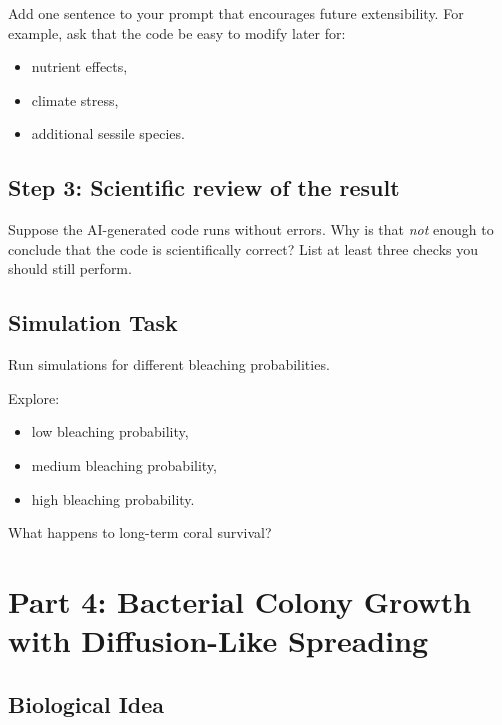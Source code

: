\documentclass[paper=letter, fontsize=12pt]{article}
\numberwithin{equation}{section}
\begin{document}
\begin{aibox}
Add one sentence to your prompt that encourages future extensibility. For example, ask that the code be easy to modify later for:
\begin{itemize}
\item nutrient effects,
\item climate stress,
\item additional sessile species.
\end{itemize}
\end{aibox}

\subsection*{Step 3: Scientific review of the result}

\begin{taskbox}
Suppose the AI-generated code runs without errors. Why is that \emph{not} enough to conclude that the code
is scientifically correct? List at least three checks you should still perform.
\end{taskbox}

\subsection*{Simulation Task}
Run simulations for different bleaching probabilities.

\begin{taskbox}
Explore:
\begin{itemize}
\item low bleaching probability,
\item medium bleaching probability,
\item high bleaching probability.
\end{itemize}

What happens to long-term coral survival?
\end{taskbox}

\section*{Part 4: Bacterial Colony Growth with Diffusion-Like Spreading}

\subsection*{Biological Idea}
\end{document}
